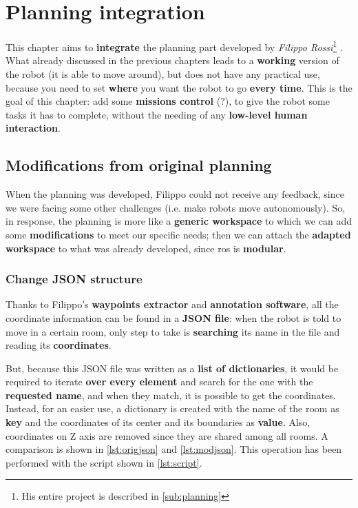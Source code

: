 \chapter{Planning integration} %
\label{cha:planningbridge}

This chapter aims to \textbf{integrate} the planning part developed by \textit{Filippo Rossi}\footnote{His entire project is described in \autoref{sub:planning}} \cite{fr}. What already discussed in the previous chapters leads to a \textbf{working} version of the robot (it is able to move around), but does not have any practical use, because you need to set \textbf{where} you want the robot to go \textbf{every time}. This is the goal of this chapter: add some \textbf{missions control} (?), to give the robot some tasks it has to complete, without the needing of any \textbf{low-level human interaction}.

\section{Modifications from original planning}

When the planning was developed, Filippo could not receive any feedback, since we were facing some other challenges (i.e. make robots move autonomously). So, in response, the planning is more like a \textbf{generic workspace} to which we can add some \textbf{modifications} to meet our specific needs; then we can attach the \textbf{adapted workspace} to what was already developed, since \acrshort{ros} is \textbf{modular}.


\subsection{Change JSON structure}
\label{sub:json}

Thanks to Filippo's \textbf{waypoints extractor} and  \textbf{annotation software}, all the coordinate information can be found in a \textbf{JSON file}: when the robot is told to move in a certain room, only step to take is \textbf{searching} its name in the file and reading its \textbf{coordinates}.

But, because this JSON file was written as a \textbf{list of dictionaries}, it would be required to iterate \textbf{over every element} and search for the one with the \textbf{requested name}, and when they match, it is possible to get the coordinates. Instead, for an easier use, a dictionary is created with the name of the room as \textbf{key} and the coordinates of its center and its boundaries as \textbf{value}. Also, coordinates on Z axis are removed since they are shared among all rooms. A comparison is shown in \autoref{lst:origjson} and \autoref{lst:modjson}. This operation has been performed with the  script shown in \autoref{lst:script}.


